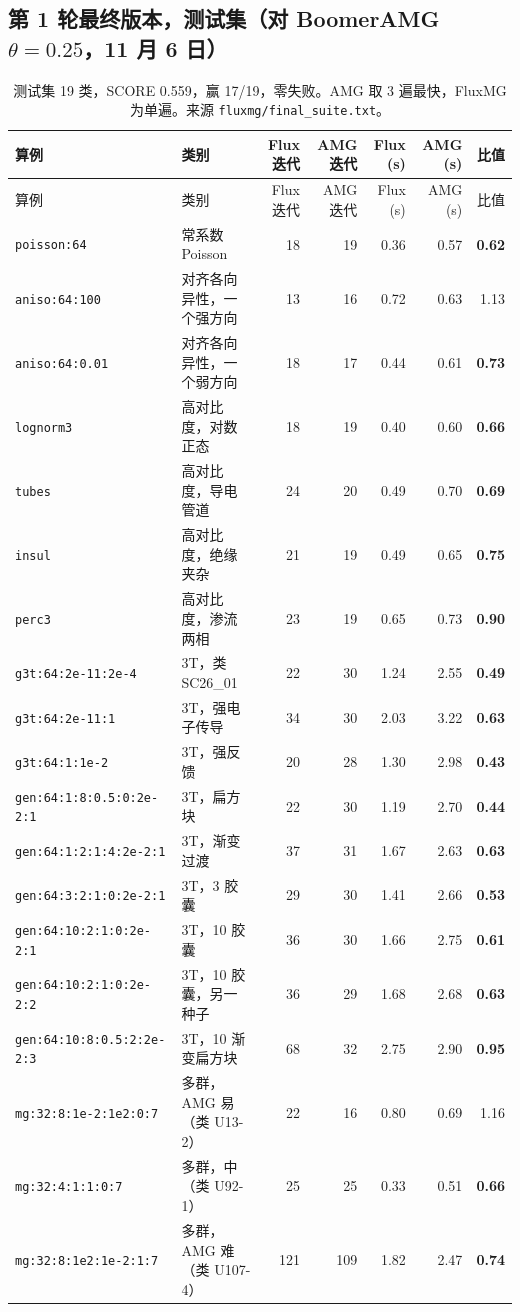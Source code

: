 \subsection{第 1 轮最终版本，测试集（对 BoomerAMG $\theta=0.25$，11 月 6 日）}
{\footnotesize\setlength{\tabcolsep}{4pt}
\begin{longtable}{llrrrrr}
\caption{测试集 19 类，SCORE 0.559，赢 17/19，零失败。AMG 取 3 遍最快，FluxMG 为单遍。来源 \texttt{fluxmg/final\_suite.txt}。}\\
\toprule
算例 & 类别 & Flux 迭代 & AMG 迭代 & Flux (s) & AMG (s) & 比值 \\
\midrule
\endfirsthead
\toprule
算例 & 类别 & Flux 迭代 & AMG 迭代 & Flux (s) & AMG (s) & 比值 \\
\midrule
\endhead
\bottomrule
\endlastfoot
\texttt{poisson:64} & 常系数 Poisson & 18 & 19 & 0.36 & 0.57 & \textbf{0.62} \\
\texttt{aniso:64:100} & 对齐各向异性，一个强方向 & 13 & 16 & 0.72 & 0.63 & 1.13 \\
\texttt{aniso:64:0.01} & 对齐各向异性，一个弱方向 & 18 & 17 & 0.44 & 0.61 & \textbf{0.73} \\
\texttt{lognorm3} & 高对比度，对数正态 & 18 & 19 & 0.40 & 0.60 & \textbf{0.66} \\
\texttt{tubes} & 高对比度，导电管道 & 24 & 20 & 0.49 & 0.70 & \textbf{0.69} \\
\texttt{insul} & 高对比度，绝缘夹杂 & 21 & 19 & 0.49 & 0.65 & \textbf{0.75} \\
\texttt{perc3} & 高对比度，渗流两相 & 23 & 19 & 0.65 & 0.73 & \textbf{0.90} \\
\texttt{g3t:64:2e-11:2e-4} & 3T，类 SC26\_01 & 22 & 30 & 1.24 & 2.55 & \textbf{0.49} \\
\texttt{g3t:64:2e-11:1} & 3T，强电子传导 & 34 & 30 & 2.03 & 3.22 & \textbf{0.63} \\
\texttt{g3t:64:1:1e-2} & 3T，强反馈 & 20 & 28 & 1.30 & 2.98 & \textbf{0.43} \\
\texttt{gen:64:1:8:0.5:0:2e-2:1} & 3T，扁方块 & 22 & 30 & 1.19 & 2.70 & \textbf{0.44} \\
\texttt{gen:64:1:2:1:4:2e-2:1} & 3T，渐变过渡 & 37 & 31 & 1.67 & 2.63 & \textbf{0.63} \\
\texttt{gen:64:3:2:1:0:2e-2:1} & 3T，3 胶囊 & 29 & 30 & 1.41 & 2.66 & \textbf{0.53} \\
\texttt{gen:64:10:2:1:0:2e-2:1} & 3T，10 胶囊 & 36 & 30 & 1.66 & 2.75 & \textbf{0.61} \\
\texttt{gen:64:10:2:1:0:2e-2:2} & 3T，10 胶囊，另一种子 & 36 & 29 & 1.68 & 2.68 & \textbf{0.63} \\
\texttt{gen:64:10:8:0.5:2:2e-2:3} & 3T，10 渐变扁方块 & 68 & 32 & 2.75 & 2.90 & \textbf{0.95} \\
\texttt{mg:32:8:1e-2:1e2:0:7} & 多群，AMG 易（类 U13-2） & 22 & 16 & 0.80 & 0.69 & 1.16 \\
\texttt{mg:32:4:1:1:0:7} & 多群，中（类 U92-1） & 25 & 25 & 0.33 & 0.51 & \textbf{0.66} \\
\texttt{mg:32:8:1e2:1e-2:1:7} & 多群，AMG 难（类 U107-4） & 121 & 109 & 1.82 & 2.47 & \textbf{0.74} \\
\end{longtable}}
